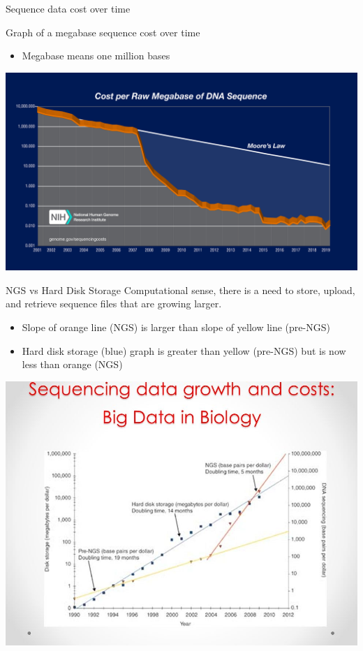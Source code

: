 \documentclass{beamer}
\begin{document}
    \begin{frame}{Sequence data cost over time}
    
    Graph of a megabase sequence cost over time \cite{genomics-cost}
    \begin{itemize}
        \item Megabase means one million bases
    \end{itemize}
    \centering
    \includegraphics[scale=0.1]{seq-cost.jpeg}
        
    \end{frame}
    
    
    \begin{frame}{NGS vs Hard Disk Storage}
            Computational sense, there is a need to store, upload, and retrieve sequence files that are growing larger. 
            \begin{itemize}
            \item Slope of orange line (NGS) is larger than slope of yellow line (pre-NGS)
            \item Hard disk storage (blue) graph is greater than yellow (pre-NGS) but is now less than orange (NGS)
            \end{itemize}
            \centering
                \includegraphics[scale=0.2]{seq-data.jpeg}

    \end{frame}
    
\end{document}
